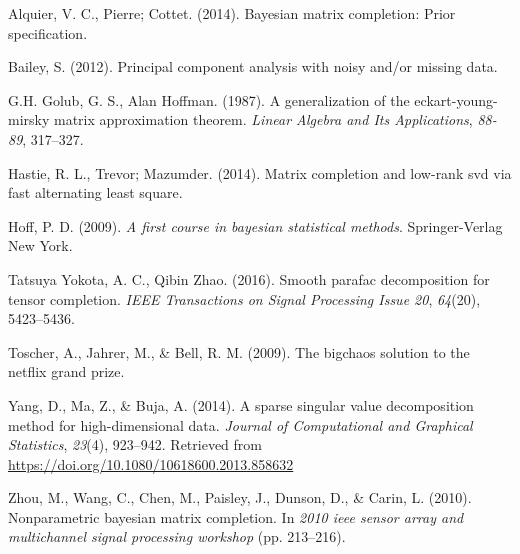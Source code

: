 \documentclass[12pt,twoside]{dukestatscithesis}
\theoremstyle{definition}
\theoremstyle{definition}
\theoremstyle{definition}
\theoremstyle{remark}
\begin{document}
\hypertarget{ref-prior2014}{}
Alquier, V. C., Pierre; Cottet. (2014). Bayesian matrix completion:
Prior specification.

\hypertarget{ref-pca2012}{}
Bailey, S. (2012). Principal component analysis with noisy and/or
missing data.

\hypertarget{ref-EYM1987}{}
G.H. Golub, G. S., Alan Hoffman. (1987). A generalization of the
eckart-young-mirsky matrix approximation theorem. \emph{Linear Algebra
and Its Applications}, \emph{88-89}, 317--327.

\hypertarget{ref-fastALS2014}{}
Hastie, R. L., Trevor; Mazumder. (2014). Matrix completion and low-rank
svd via fast alternating least square.

\hypertarget{ref-hoff2009}{}
Hoff, P. D. (2009). \emph{A first course in bayesian statistical
methods}. Springer-Verlag New York.

\hypertarget{ref-smoothParafac2016}{}
Tatsuya Yokota, A. C., Qibin Zhao. (2016). Smooth parafac decomposition
for tensor completion. \emph{IEEE Transactions on Signal Processing
Issue 20}, \emph{64}(20), 5423--5436.

\hypertarget{ref-netflix2009}{}
Toscher, A., Jahrer, M., \& Bell, R. M. (2009). The bigchaos solution to
the netflix grand prize.

\hypertarget{ref-sparse2014}{}
Yang, D., Ma, Z., \& Buja, A. (2014). A sparse singular value
decomposition method for high-dimensional data. \emph{Journal of
Computational and Graphical Statistics}, \emph{23}(4), 923--942.
Retrieved from \url{https://doi.org/10.1080/10618600.2013.858632}

\hypertarget{ref-gibbs2010}{}
Zhou, M., Wang, C., Chen, M., Paisley, J., Dunson, D., \& Carin, L.
(2010). Nonparametric bayesian matrix completion. In \emph{2010 ieee
sensor array and multichannel signal processing workshop} (pp.
213--216).


\end{document}
